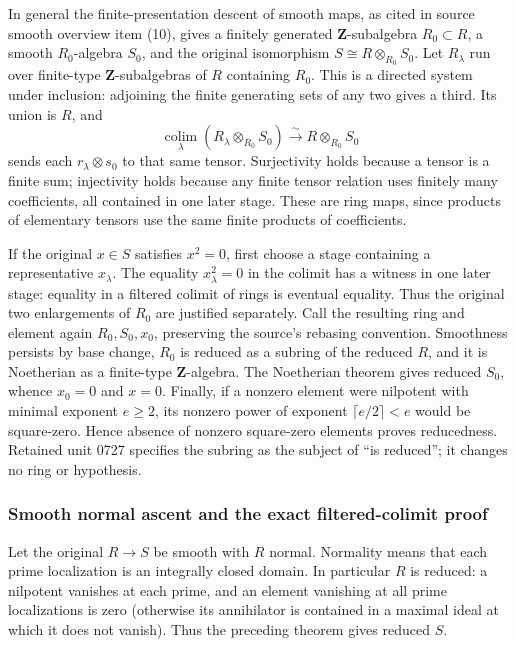 In general the finite-presentation descent of smooth maps, as cited in source smooth overview item (10), gives a finitely generated \(\mathbf Z\)-subalgebra \(R_0\subset R\), a smooth \(R_0\)-algebra \(S_0\), and the original isomorphism \(S\cong R\otimes_{R_0}S_0\). Let \(R_\lambda\) run over finite-type \(\mathbf Z\)-subalgebras of \(R\) containing \(R_0\). This is a directed system under inclusion: adjoining the finite generating sets of any two gives a third. Its union is \(R\), and \[
 \underset{\lambda}{\operatorname{colim}}
 (R_\lambda\otimes_{R_0}S_0)
 \xrightarrow{\sim}R\otimes_{R_0}S_0
\] sends each \(r_\lambda\otimes s_0\) to that same tensor. Surjectivity holds because a tensor is a finite sum; injectivity holds because any finite tensor relation uses finitely many coefficients, all contained in one later stage. These are ring maps, since products of elementary tensors use the same finite products of coefficients.

If the original \(x\in S\) satisfies \(x^2=0\), first choose a stage containing a representative \(x_\lambda\). The equality \(x_\lambda^2=0\) in the colimit has a witness in one later stage: equality in a filtered colimit of rings is eventual equality. Thus the original two enlargements of \(R_0\) are justified separately. Call the resulting ring and element again \(R_0,S_0,x_0\), preserving the source's rebasing convention. Smoothness persists by base change, \(R_0\) is reduced as a subring of the reduced \(R\), and it is Noetherian as a finite-type \(\mathbf Z\)-algebra. The Noetherian theorem gives reduced \(S_0\), whence \(x_0=0\) and \(x=0\). Finally, if a nonzero element were nilpotent with minimal exponent \(e\ge2\), its nonzero power of exponent \(\lceil e/2\rceil<e\) would be square-zero. Hence absence of nonzero square-zero elements proves reducedness. Retained unit 0727 specifies the subring as the subject of ``is reduced''; it changes no ring or hypothesis.

\subsubsection{Smooth normal ascent and the exact filtered-colimit proof}\label{algebra-proof-068-smooth-normal-ascent-and-the-exact-filtered-colimit-proof}

Let the original \(R\to S\) be smooth with \(R\) normal. Normality means that each prime localization is an integrally closed domain. In particular \(R\) is reduced: a nilpotent vanishes at each prime, and an element vanishing at all prime localizations is zero (otherwise its annihilator is contained in a maximal ideal at which it does not vanish). Thus the preceding theorem gives reduced \(S\).

